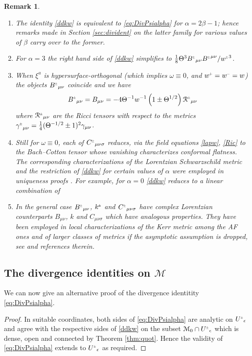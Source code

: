 \documentclass[a4paper,10pt,reqno]{amsart}
\newcommand{\cR}{\mathcal{R}}
\newcommand{\cM}{\mathcal{M}}
\newcommand{\Th}{\Theta}
\newcommand{\al}{\alpha}
\newcommand{\si}{\sigma}
\theoremstyle{plain}
\newtheorem{remark}[thm]{Remark}
\renewcommand{\P}[1]{{{#1}^{\hspace{-.5pt}\scaleto{+}{4pt}}}}
\newcommand{\M}[1]{{{#1}^{\hspace{-.5pt}\scaleto{-}{4pt}}}}
\newcommand{\PM}[1]{{{#1}^{\hspace{-.5pt}\scaleto{\pm}{3.5pt}}}}
\newcommand{\eps}{\epsilon}
\numberwithin{equation}{section}
\begin{document}
\begin{remark} \label{divrem}~
\begin{enumerate} 
\item \label{point:divrem:1}
The identity \eqref{ddkw} is equivalent to \eqref{eq:DivPsialpha} for $\alpha = 2\beta - 1$; hence remarks made in Section \ref{sec:divident} on the latter family for various values of $\beta$ carry over to the former.
\item
For $\al = 3$ the right hand side of \eqref{ddkw} simplifies to $\frac{1}{8} \Theta^{3}  \PM{B}_{\mu\nu} \PM{B}^{\mu\nu} / \PM{w}^{3}$.
\item 
When $\xi^{a}$ is hypersurface-orthogonal (which implies $\omega \equiv 0$, and $\P{w} = \M{w} = w$) the objects  $\PM{B}_{\mu\nu}$ coincide and we have
\begin{equation} 
\PM{B}_{\mu\nu} = B_{\mu\nu} = - 4 \Th^{-1} w^{-1} \left (1 \pm \Th^{1/2} \right) \PM{\cR}_{\mu\nu} 
\end{equation}
where $\PM{\cR}_{\mu\nu}$ are  the Ricci tensors with respect to the metrics $\PM{\gamma}_{\mu\nu}  =  \frac{1}{4} (\Th^{- 1/2} \pm 1)^2 \gamma_{\mu\nu}$.
\item
Still for $\omega \equiv 0$, each of $\PM{C}_{\mu\nu\si}$ reduces, via the field equations \eqref{lapw}, \eqref{Ric} to the Bach--Cotton tensor whose vanishing characterizes conformal flatness. The corresponding characterizations of the Lorentzian  Schwarzschild metric and the restriction of \eqref{ddkw} for certain values of $\al$ were employed in uniqueness proofs \cite{1967PhRv..164.1776I,MR398432}. For example, for $\al =0$ \eqref{ddkw} reduces  to a linear combination of \cite[Eq. (2.12)-(2.13)]{MR398432}
\item
In the general case $\PM{B}_{\mu\nu}$, $\PM{k}$ and $\PM{C}_{\mu\nu\si}$  have complex Lorentzian counterparts $B_{\mu\nu}$, $k$ and $C_{\mu\nu\si}$ which have analogous properties. They have been employed in local characterizations of the Kerr metric among the AF ones \cite{MR747036} and of larger classes of metrics if the asymptotic assumption is dropped, see  \cite{nozawa2021alternative} and references therein. 
\end{enumerate} 
\end{remark}

\subsection{The divergence identities on $\cM$}
We can now give an alternative proof of the divergence identitity \eqref{eq:DivPsialpha}.
\begin{proof} 
In suitable coordinates, both sides of \eqref{eq:DivPsialpha} are analytic on $\PM{U}_\eps$ and agree with the respective sides of \eqref{ddkw} on the  subset $\cM_0 \cap \PM{U}_\eps$ which is dense, open and connected by Theorem \ref{thm:quot}. Hence the validity of \eqref{eq:DivPsialpha} extends to $\PM{U}_\eps$ as required.
\end{proof}
\end{document}
